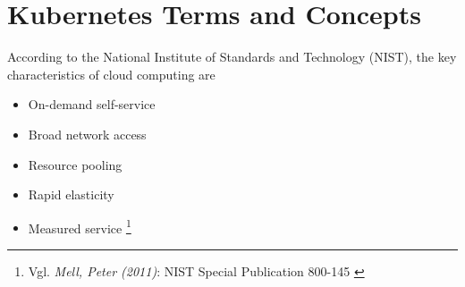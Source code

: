 %
%

\pagebreak
\section{Kubernetes Terms and Concepts}

\onehalfspacing

According to the National Institute of Standards and Technology (NIST), the key characteristics of cloud computing are 
\begin{itemize}
\item On-demand self-service
\item Broad network access
\item Resource pooling
\item Rapid elasticity
\item Measured service \footnote{Vgl. \textit{Mell, Peter (2011)}: NIST Special Publication 800-145 \cite{sp800-145}}
\end{itemize}

